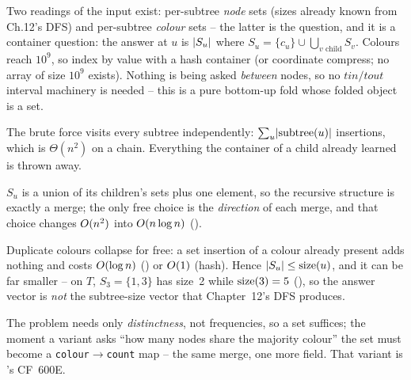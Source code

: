 Two readings of the input exist: per-subtree \emph{node} sets (sizes already
known from Ch.12's DFS) and per-subtree \emph{colour} sets -- the latter is the
question, and it is a container question: the answer at \(u\) is
\(\lvert S_u\rvert\) where \(S_u=\{c_u\}\cup\bigcup_{v\text{ child}}S_v\).  Colours
reach \(10^9\), so index by value with a hash container (or coordinate
compress; no array of size \(10^9\) exists).  Nothing is being asked
\emph{between} nodes, so no \(tin/tout\) interval machinery is needed -- this
is a pure bottom-up fold whose folded object is a set.

The brute force visits every subtree independently: \(\sum_u\lvert\text{subtree}
(u)\rvert\) insertions, which is \(\Theta(n^2)\) on a chain.  Everything the
container of a child already learned is thrown away.

\begin{observation}
\(S_u\) is a union of its children's sets plus one element, so the recursive
structure is exactly a merge; the only free choice is the \emph{direction} of
each merge, and that choice changes \(O(n^2)\) into \(O(n\log n)\)
().
\end{observation}
\begin{observation}
Duplicate colours collapse for free: a set insertion of a colour already
present adds nothing and costs \(O(\log n)\) () or
\(O(1)\) (hash).  Hence \(\lvert S_u\rvert\le\operatorname{size}(u)\), and it can be far
smaller -- on \(T\), \(S_3=\{1,3\}\) has size~2 while \(\operatorname{size}(3)=5\)
(), so the answer vector is \emph{not} the subtree-size
vector that Chapter~12's DFS produces.
\end{observation}
\begin{observation}
The problem needs only \emph{distinctness}, not frequencies, so a set suffices;
the moment a variant asks ``how many nodes share the majority colour'' the set
must become a \texttt{colour\(\to\)count} map -- the same merge, one more
field.  That variant is 's CF~600E.
\end{observation}

